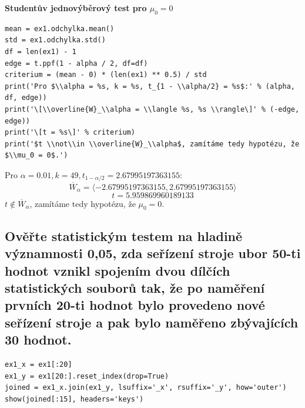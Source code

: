 \documentclass[11pt,titlepage]{article}
\begin{document}
\textbf{Studentův jednovýběrový test pro \(\mu_0 = 0\)}
\begin{listing}[htbp]
\begin{verbatim}
mean = ex1.odchylka.mean()
std = ex1.odchylka.std()
df = len(ex1) - 1
edge = t.ppf(1 - alpha / 2, df=df)
criterium = (mean - 0) * (len(ex1) ** 0.5) / std
print('Pro $\\alpha = %s, k = %s, t_{1 - \\alpha/2} = %s$:' % (alpha, df, edge))
print('\[\\overline{W}_\\alpha = \\langle %s, %s \\rangle\]' % (-edge, edge))
print('\[t = %s\]' % criterium)
print('$t \\not\\in \\overline{W}_\\alpha$, zamítáme tedy hypotézu, že $\\mu_0 = 0$.')
\end{verbatim}
\end{listing}

Pro \(\alpha = 0.01, k = 49, t_{1 - \alpha/2} = 2.67995197363155\):
\[\overline{W}_\alpha = \langle -2.67995197363155, 2.67995197363155 \rangle\]
\[t = 5.959869960189133\]
\(t \not\in \overline{W}_\alpha\), zamítáme tedy hypotézu, že \(\mu_0 = 0\).

\newpage

\subsection{Ověřte statistickým testem na hladině významnosti 0,05, zda seřízení stroje ubor 50-ti hodnot vznikl spojením dvou dílčích statistických souborů tak, že po naměření prvních 20-ti hodnot bylo provedeno nové seřízení stroje a pak bylo naměřeno zbývajících 30 hodnot.}
\label{sec:org00d3893}

\begin{listing}[htbp]
\begin{verbatim}
ex1_x = ex1[:20]
ex1_y = ex1[20:].reset_index(drop=True)
joined = ex1_x.join(ex1_y, lsuffix='_x', rsuffix='_y', how='outer')
show(joined[:15], headers='keys')
\end{verbatim}
\end{listing}
\end{document}

